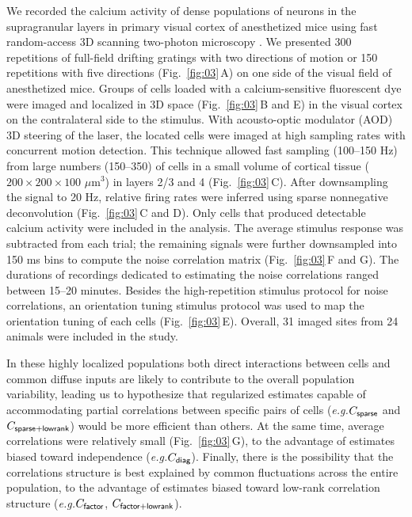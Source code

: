 \documentclass[10pt]{article}
\begin{document}
We recorded the calcium activity of dense populations of neurons in the supragranular layers in primary visual cortex of anesthetized mice using fast random-access 3D scanning two-photon microscopy \cite{Reddy:2005,Katona:2012,Cotton:2013}. We presented 300 repetitions of full-field drifting gratings with two directions of motion or 150 repetitions with five directions (Fig.~\ref{fig:03}\,A) on one side of the visual field of anesthetized mice. Groups of cells loaded with a calcium-sensitive fluorescent dye were imaged and localized in 3D space (Fig.~\ref{fig:03}\,B and E) in the visual cortex on the contralateral side to the stimulus. With acousto-optic modulator (AOD) 3D steering of the laser, the located cells were imaged at high sampling rates with concurrent motion detection.  This technique allowed fast sampling (100--150 Hz) from large numbers (150--350) of cells in a small volume of cortical tissue ($200\times200\times100$ $\mu$m$^3$) in layers 2/3 and 4 (Fig.~\ref{fig:03}\,C). After downsampling the signal to 20 Hz, relative firing rates were inferred using sparse nonnegative deconvolution \cite{Vogelstein:2010} (Fig.~\ref{fig:03}\,C and D). Only cells that produced detectable calcium activity were included in the analysis. The average stimulus response was subtracted from each trial; the remaining signals were further downsampled into 150 ms bins to compute the noise correlation matrix (Fig.~\ref{fig:03}\,F and G). The durations of recordings dedicated to estimating the noise correlations ranged between 15--20 minutes.  Besides the high-repetition stimulus protocol for noise correlations, an orientation tuning stimulus protocol was used to map the orientation tuning of each cells (Fig.~\ref{fig:03}\,E). Overall, 31 imaged sites from 24 animals were included in the study.

In these highly localized populations both direct interactions between cells and common diffuse inputs are likely to contribute to the overall population variability, leading us to hypothesize that regularized estimates capable of accommodating partial correlations between specific pairs of cells (\emph{e.g.}\;$C_{\sf sparse}$ and $C_{\sf sparse+lowrank}$) would be more efficient than others. At the same time, average correlations were relatively small (Fig.~\ref{fig:03}\,G), to the advantage of estimates biased toward independence (\emph{e.g.}\;$C_{\sf diag}$). Finally, there is the possibility that the correlations structure is best explained by common fluctuations across the entire population, to the advantage of estimates biased toward low-rank correlation structure (\emph{e.g.}\;$C_{\sf factor}$, $C_{\sf factor+lowrank}$).
\end{document}
